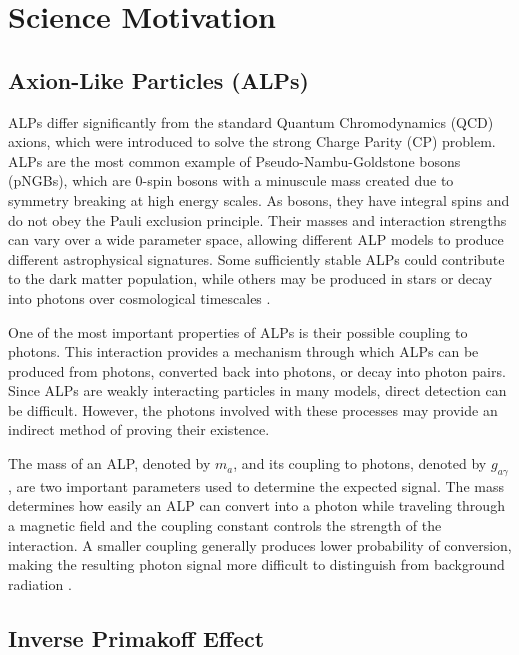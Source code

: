 \documentclass[10pt,letterpaper,twocolumn]{article}
\begin{document}
\section{Science Motivation}

\subsection{Axion-Like Particles (ALPs)}

ALPs differ significantly from the standard Quantum Chromodynamics (QCD) axions, which were introduced to solve the strong Charge Parity (CP) problem. ALPs are the most common example of Pseudo-Nambu-Goldstone bosons (pNGBs), which are 0-spin bosons with a minuscule mass created due to symmetry breaking at high energy scales. As bosons, they have integral spins and do not obey the Pauli exclusion principle. Their masses and interaction strengths can vary over a wide parameter space, allowing different ALP models to produce different astrophysical signatures. Some sufficiently stable ALPs could contribute to the dark matter population, while others may be produced in stars or decay into photons over cosmological timescales \cite{chakraborti2026probing, porrasbedmar2024decaying}. 

One of the most important properties of ALPs is their possible coupling to photons. This interaction provides a mechanism through which ALPs can be produced from photons, converted back into photons, or decay into photon pairs. Since ALPs are weakly interacting particles in many models, direct detection can be difficult. However, the photons involved with these processes may provide an indirect method of proving their existence. 

The mass of an ALP, denoted by $m_a$, and its coupling to photons, denoted by $g_{a\gamma}$, are two important parameters used to determine the expected signal. The mass determines how easily an ALP can convert into a photon while traveling through a magnetic field and the coupling constant controls the strength of the interaction. A smaller coupling generally produces lower probability of conversion, making the resulting photon signal more difficult to distinguish from background radiation \cite{chakraborti2026probing, davoudiasl2008gecosax}. 

\subsection{Inverse Primakoff Effect}
\end{document}

